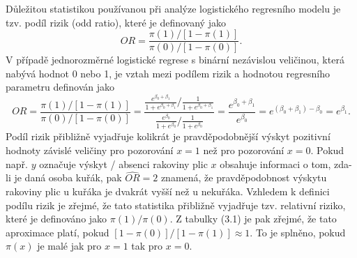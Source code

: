 Důležitou statistikou používanou při analýze logistického regresního modelu je tzv. podíl rizik (odd ratio), které je definovaný jako
\begin{equation}
OR = \frac{\pi(1) / [1 - \pi(1)]}{\pi(0) / [1 - \pi(0)]}.
\end{equation}
V případě jednorozměrné logistické regrese s binární nezávislou veličinou, která nabývá hodnot 0 nebo 1, je vztah mezi podílem rizik a hodnotou regresního parametru definován jako
\begin{equation}
OR = \frac{\pi(1) / [1 - \pi(1)]}{\pi(0) / [1 - \pi(0)]} = \frac{\frac{e^{\beta_0 + \beta_1}}{1 + e^{\beta_0 + \beta_1}} \Big/ \frac{1}{1 + e^{\beta_0 + \beta_1}}}{\frac{e^{\beta_0}}{1 + e^{\beta_0}} \Big/ \frac{1}{1 + e^{\beta_0}}} = \frac{e^{\beta_0 + \beta_1}}{e^{\beta_0}} = e^{(\beta_0 + \beta_1) - \beta_0} = e^{\beta_1}.
\end{equation}
Podíl rizik přibližně vyjadřuje kolikrát je pravděpodobnější výskyt pozitivní hodnoty závislé veličiny pro pozorování $x = 1$ než pro pozorování $x = 0$. Pokud např. $y$ označuje výskyt / absenci rakoviny plic $x$ obsahuje informaci o tom, zda-li je daná osoba kuřák, pak $\widehat{OR} = 2$ znamená, že pravděpodobnost výskytu rakoviny plic u kuřáka je dvakrát vyšší než u nekuřáka. Vzhledem k definici podílu rizik je zřejmé, že tato statistika přibližně vyjadřuje tzv. relativní riziko, které je definováno jako $\pi(1) / \pi(0)$. Z tabulky (3.1) je pak zřejmé, že tato aproximace platí, pokud $[1 - \pi(0)] / [1 - \pi(1)] \approx 1$. To je splněno, pokud $\pi(x)$ je malé jak pro $x = 1$ tak pro $x = 0$.

